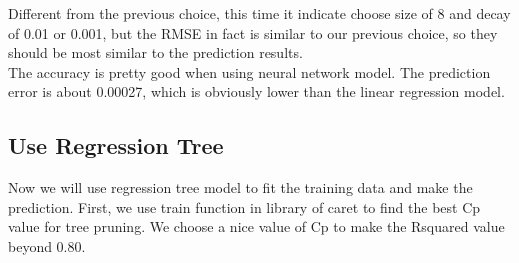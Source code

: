\documentclass{article}%
\begin{document}
\indent Different from the previous choice, this time it indicate choose size of 8 and decay of 0.01 or 0.001, but the RMSE in fact is similar to our previous choice, so they should be most similar to the prediction results.\\
\indent The accuracy is pretty good when using neural network model. The prediction error is about 0.00027, which is obviously lower than the linear regression model.

\subsection{Use Regression Tree}
Now we will use regression tree model to fit the training data and make the prediction. First, we use train function in library of caret to find the best Cp value for tree pruning. We choose a nice value of Cp to make the Rsquared value beyond 0.80.
\end{document}

